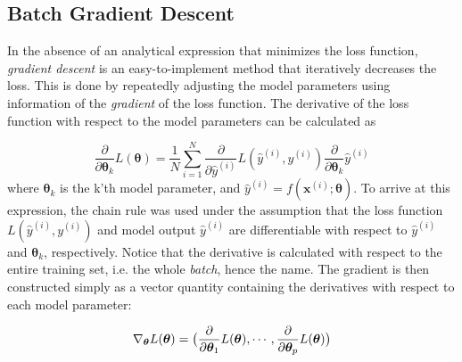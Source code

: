 


\subsection{Batch Gradient Descent}\label{sec:GradientDescent}
In the absence of an analytical expression that minimizes the loss function, \emph{gradient descent} is an easy-to-implement method that iteratively decreases the loss. This is done by repeatedly adjusting the model parameters using information of the \emph{gradient} of the loss function. The derivative of the loss function with respect to the model parameters can be calculated as

\begin{equation}\label{eq:LossDerivateWRTparameter}
    \frac{\partial}{\partial \boldsymbol{\theta}_k} L(\boldsymbol{\theta}) =
    \frac{1}{N}\sum_{i=1}^{N} \frac{\partial}{\partial \hat{y}^{(i)}} L( \hat{y}^{(i)}, y^{(i)})
    \frac{\partial}{\partial \boldsymbol{\theta}_k}\hat{y}^{(i)}
\end{equation}
where $\boldsymbol{\theta}_k$ is the k'th model parameter, and  $\hat{y}^{(i)} = f(\boldsymbol{x}^{(i)}; \boldsymbol{\theta})$. To arrive at this expression, the chain rule was used under the assumption that the loss function $L(\hat{y}^{(i)}, y^{(i)})$ and model output $\hat{y}^{(i)}$ are differentiable with respect to $\hat{y}^{(i)}$ and $\boldsymbol{\theta}_k$, respectively. Notice that the derivative is calculated with respect to the entire training set, i.e. the whole \emph{batch}, hence the name. The gradient is then constructed simply as a vector quantity containing the derivatives with respect to each model parameter:

\begin{equation}\label{eq:Gradient}
    \nabla_{\boldsymbol{\theta}} L(\boldsymbol{\theta})= 
    \big{(} \frac{\partial}{\partial \boldsymbol{\theta}_1} L(\boldsymbol{\theta}), 
    \cdots, \frac{\partial}{\partial \boldsymbol{\theta}_p} L(\boldsymbol{\theta}) \big{)}
\end{equation}

